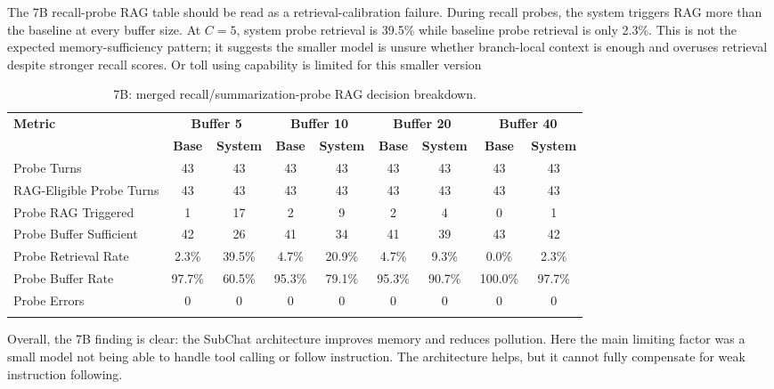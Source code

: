 The 7B recall-probe RAG table should be read as a retrieval-calibration failure. During recall probes, the system triggers RAG more than the baseline at every buffer size. At $C=5$, system probe retrieval is 39.5\% while baseline probe retrieval is only 2.3\%. This is not the expected memory-sufficiency pattern; it suggests the smaller model is unsure whether branch-local context is enough and overuses retrieval despite stronger recall scores. Or toll using capability is limited for this smaller version

\begin{table}[htbp]
\caption{7B: merged recall/summarization-probe RAG decision breakdown.}\label{tab:7b_rag_main}
\centering
\tiny
\setlength{\tabcolsep}{2.2pt}
\begin{adjustbox}{width=\textwidth}
\begin{tabular}{lcccccccc}
\toprule
\textbf{Metric} & \multicolumn{2}{c}{\textbf{Buffer 5}} & \multicolumn{2}{c}{\textbf{Buffer 10}} & \multicolumn{2}{c}{\textbf{Buffer 20}} & \multicolumn{2}{c}{\textbf{Buffer 40}} \\
\cmidrule(lr){2-3}\cmidrule(lr){4-5}\cmidrule(lr){6-7}\cmidrule(lr){8-9}
 & \textbf{Base} & \textbf{System} & \textbf{Base} & \textbf{System} & \textbf{Base} & \textbf{System} & \textbf{Base} & \textbf{System} \\
\midrule
Probe Turns & 43 & 43 & 43 & 43 & 43 & 43 & 43 & 43 \\
RAG-Eligible Probe Turns & 43 & 43 & 43 & 43 & 43 & 43 & 43 & 43 \\
Probe RAG Triggered & 1 & 17 & 2 & 9 & 2 & 4 & 0 & 1 \\
Probe Buffer Sufficient & 42 & 26 & 41 & 34 & 41 & 39 & 43 & 42 \\
Probe Retrieval Rate & 2.3\% & 39.5\% & 4.7\% & 20.9\% & 4.7\% & 9.3\% & 0.0\% & 2.3\% \\
Probe Buffer Rate & 97.7\% & 60.5\% & 95.3\% & 79.1\% & 95.3\% & 90.7\% & 100.0\% & 97.7\% \\
Probe Errors & 0 & 0 & 0 & 0 & 0 & 0 & 0 & 0 \\
\botrule
\end{tabular}
\end{adjustbox}
\end{table}

Overall, the 7B finding is clear: the SubChat architecture improves memory and reduces pollution. Here the main limiting factor was a small model not being able to handle tool calling or follow instruction. The architecture helps, but it cannot fully compensate for weak instruction following.

